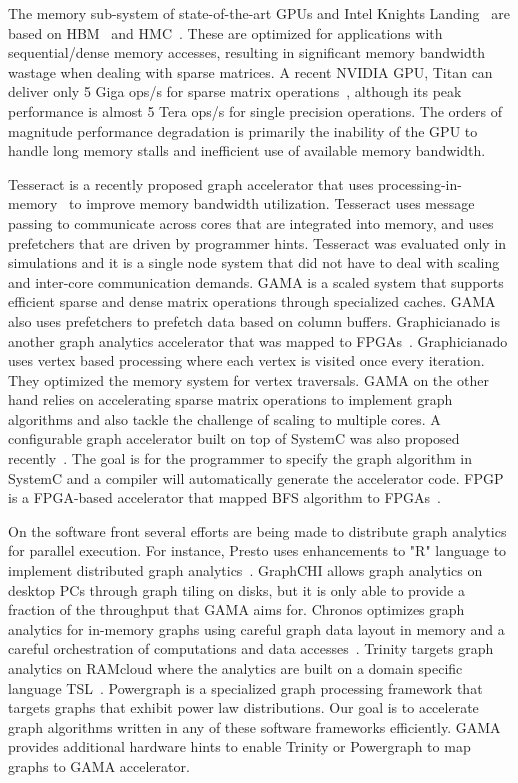 \noindent
The memory sub-system of state-of-the-art GPUs and Intel Knights Landing~\cite{knight:intel:2016} 
are based on HBM~\cite{hbm} and HMC~\cite{hmc}. These are optimized for applications with sequential/dense memory accesses, resulting in significant memory bandwidth wastage when dealing with sparse matrices.
A recent NVIDIA GPU, Titan can deliver only 5 Giga ops/s for sparse matrix operations~\cite{liu2014efficient}, although its peak performance is almost 5 Tera ops/s for single precision operations. The orders of magnitude performance degradation is primarily the inability of the GPU to handle long memory stalls and inefficient use of available memory bandwidth.  

Tesseract is a recently proposed graph accelerator that uses processing-in-memory~\cite{ahn2015scalable} to improve memory bandwidth utilization.  Tesseract uses message passing to communicate across cores that are integrated into memory, and uses  prefetchers that are driven by programmer hints. Tesseract was evaluated only in simulations and it is a single node system that did not have to deal with scaling and inter-core communication demands. GAMA is a scaled system that supports efficient sparse and dense matrix operations through specialized caches. GAMA also uses prefetchers to prefetch data based on column buffers. Graphicianado is another graph analytics accelerator that was mapped to FPGAs~\cite{Ham2016}.  Graphicianado uses vertex based processing  where each vertex is visited once every iteration. They optimized the memory system for vertex traversals. GAMA on the other hand relies on accelerating sparse matrix operations to implement graph algorithms and also tackle the challenge of scaling to multiple cores. A configurable graph accelerator built on top of SystemC was also proposed recently~\cite{ozdal2016energy}. The goal is for the programmer to specify the graph algorithm in SystemC and a compiler will automatically generate the accelerator code. FPGP is a FPGA-based accelerator that mapped BFS algorithm to FPGAs~\cite{dai2016fpgp}. 

On the software front several efforts are being made to distribute graph analytics for parallel execution. For instance, Presto uses enhancements to "R" language to implement distributed graph analytics~\cite{venkataraman2013presto}. GraphCHI allows graph analytics on desktop PCs through graph tiling on disks, but it is only able to provide a fraction of the throughput that GAMA aims for. Chronos optimizes graph analytics for in-memory graphs using careful graph data layout in memory and a careful orchestration of computations and data accesses~\cite{han2014chronos}. Trinity targets graph analytics on RAMcloud where the analytics are built on a domain specific language TSL~\cite{shao2013trinity}. Powergraph is a specialized graph processing framework that targets graphs that exhibit power law distributions. Our goal is to accelerate graph algorithms written in any of these software frameworks efficiently. GAMA provides additional hardware hints to enable Trinity or Powergraph to map graphs to GAMA accelerator. 

